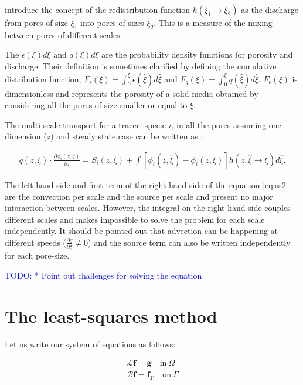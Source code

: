 \documentclass{CFD2011}
\newcommand{\TODO}[1]{\textcolor{blue}{TODO: #1} \\}
\begin{document}
\cite{DupuySchwarz} introduce the concept of the redistribution function $h(\xi_1 \rightarrow \xi_2)$ as the discharge from pores of size $\xi_1$ into pores of sizes $\xi_2$. This is a measure of the mixing between pores of different scales.

The $\epsilon(\xi)d\xi$ and $q(\xi)d\xi$ are the probability density functions for porosity and discharge. Their definition is sometimes clarified by defining the cumulative distribution function, $F_{\epsilon}(\xi)=\int_0^{\xi}\epsilon(\hat \xi)d\hat\xi$ and $F_{q}(\xi)=\int_0^{\xi}q(\hat\xi)d\hat\xi$. $F_{\epsilon}(\xi)$ is dimensionless and represents the porosity of a solid media obtained by considering all the pores of size smaller or equal to $\xi$.

The multi-scale transport for a tracer, specie $i$, in all the pores assuming one dimension ($z$) and steady state case can be written as \citep{DupuySchwarz}:

\begin{align}
q(z, \xi) \cdot \frac{\partial \phi_{i}(z, \xi)}{\partial z}  = 
 S_{i}(z, \xi) + \int [\phi_{i}(z, \hat \xi) - \phi_{i}(z, \xi)] h(z, \hat \xi \rightarrow \xi) d\hat \xi . 
\label{eq:ss2}
\end{align}

The left hand side and first term of the right hand side of the equation \ref{eq:ss2} are the convection per scale and the source per scale and present no major interaction between scales. However, the integral on the right hand side couples different scales and makes impossible to solve the problem for each scale independently. It should be pointed out that advection can be happening at different speeds ($\tfrac{\partial q}{\partial \xi} \neq 0$) and the source term can also be written independently for each pore-size.

\TODO{    * Point out challenges for solving the equation}

\section{The least-squares method}
Let us write our system of equations as follows:

\begin{eqnarray}
\mathcal{L} \mathbf{f} = \mathbf{g} \quad \mbox{in} \ \Omega \label{eq:Problem} \\
\mathcal{B} \mathbf{f} = \mathbf{f_\Gamma} \quad \mbox{on} \ \Gamma \label{eq:Boundary}
\end{eqnarray}
\end{document}
